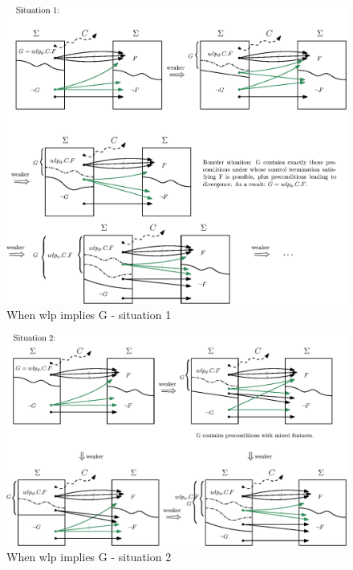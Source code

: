 \begin{figure}[ht!]\centering
\includegraphics[width=\textwidth]{image/wlp-g-1.eps}
\caption{When wlp implies G - situation 1}
\label{fig:wlp-g-1}
\end{figure}

\begin{figure}[ht!]\centering
\includegraphics[width=\textwidth]{image/wlp-g-2.eps}
\caption{When wlp implies G - situation 2}
\label{fig:wlp-g-2}
\end{figure}


